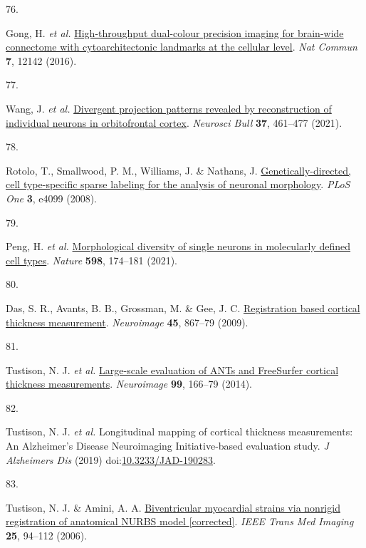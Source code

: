 \documentclass[
  12pt,
]{article}
\newlength{\cslhangindent}
\newlength{\csllabelwidth}
\newenvironment{CSLReferences}[2] %
 {\begin{list}{}{%
  \setlength{\itemindent}{0pt}
  \setlength{\leftmargin}{0pt}
  \setlength{\parsep}{0pt}
  \ifodd #1
   \setlength{\leftmargin}{\cslhangindent}
   \setlength{\itemindent}{-1\cslhangindent}
  \fi
  \setlength{\itemsep}{#2\baselineskip}}}
 {\end{list}}
\newcommand{\CSLLeftMargin}[1]{\parbox[t]{\csllabelwidth}{\strut#1\strut}}
\newcommand{\CSLRightInline}[1]{\parbox[t]{\linewidth - \csllabelwidth}{\strut#1\strut}}
\begin{document}
\begin{CSLReferences}{0}{0}
\CSLLeftMargin{76. }%
\CSLRightInline{Gong, H. \emph{et al.}
\href{https://doi.org/10.1038/ncomms12142}{High-throughput dual-colour
precision imaging for brain-wide connectome with cytoarchitectonic
landmarks at the cellular level}. \emph{Nat Commun} \textbf{7}, 12142
(2016).}

\CSLLeftMargin{77. }%
\CSLRightInline{Wang, J. \emph{et al.}
\href{https://doi.org/10.1007/s12264-020-00616-1}{Divergent projection
patterns revealed by reconstruction of individual neurons in
orbitofrontal cortex}. \emph{Neurosci Bull} \textbf{37}, 461--477
(2021).}

\CSLLeftMargin{78. }%
\CSLRightInline{Rotolo, T., Smallwood, P. M., Williams, J. \& Nathans,
J.
\href{https://doi.org/10.1371/journal.pone.0004099}{Genetically-directed,
cell type-specific sparse labeling for the analysis of neuronal
morphology}. \emph{PLoS One} \textbf{3}, e4099 (2008).}

\CSLLeftMargin{79. }%
\CSLRightInline{Peng, H. \emph{et al.}
\href{https://doi.org/10.1038/s41586-021-03941-1}{Morphological
diversity of single neurons in molecularly defined cell types}.
\emph{Nature} \textbf{598}, 174--181 (2021).}

\CSLLeftMargin{80. }%
\CSLRightInline{Das, S. R., Avants, B. B., Grossman, M. \& Gee, J. C.
\href{https://doi.org/10.1016/j.neuroimage.2008.12.016}{Registration
based cortical thickness measurement}. \emph{Neuroimage} \textbf{45},
867--79 (2009).}

\CSLLeftMargin{81. }%
\CSLRightInline{Tustison, N. J. \emph{et al.}
\href{https://doi.org/10.1016/j.neuroimage.2014.05.044}{Large-scale
evaluation of {ANTs} and {FreeSurfer} cortical thickness measurements}.
\emph{Neuroimage} \textbf{99}, 166--79 (2014).}

\CSLLeftMargin{82. }%
\CSLRightInline{Tustison, N. J. \emph{et al.} Longitudinal mapping of
cortical thickness measurements: An {A}lzheimer's {D}isease
{N}euroimaging {I}nitiative-based evaluation study. \emph{J Alzheimers
Dis} (2019)
doi:\href{https://doi.org/10.3233/JAD-190283}{10.3233/JAD-190283}.}

\CSLLeftMargin{83. }%
\CSLRightInline{Tustison, N. J. \& Amini, A. A.
\href{https://doi.org/10.1109/TMI.2005.861015}{Biventricular myocardial
strains via nonrigid registration of anatomical {NURBS} model
{[}corrected{]}}. \emph{IEEE Trans Med Imaging} \textbf{25}, 94--112
(2006).}


\end{CSLReferences}
\end{document}
